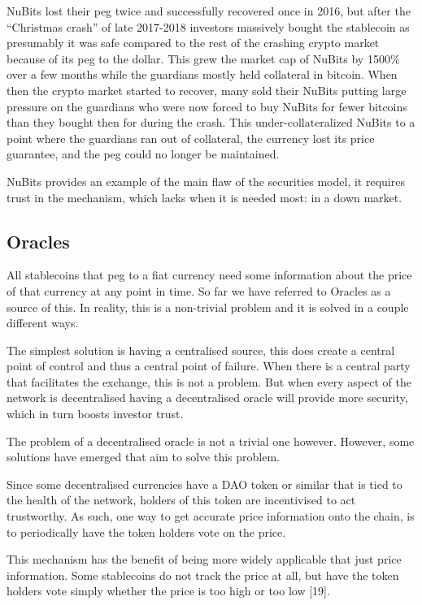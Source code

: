 \documentclass[english,]{IEEEtran}
\begin{document}
NuBits lost their peg twice and successfully recovered once in 2016, but
after the ``Christmas crash'' of late 2017-2018 investors massively
bought the stablecoin as presumably it was safe compared to the rest of
the crashing crypto market because of its peg to the dollar. This grew
the market cap of NuBits by 1500\% over a few months while the guardians
mostly held collateral in bitcoin. When then the crypto market started
to recover, many sold their NuBits putting large pressure on the
guardians who were now forced to buy NuBits for fewer bitcoins than they
bought then for during the crash. This under-collateralized NuBits to a
point where the guardians ran out of collateral, the currency lost its
price guarantee, and the peg could no longer be maintained.

NuBits provides an example of the main flaw of the securities model, it
requires trust in the mechanism, which lacks when it is needed most: in
a down market.

\subsection{Oracles}\label{oracles}

All stablecoins that peg to a fiat currency need some information about
the price of that currency at any point in time. So far we have referred
to Oracles as a source of this. In reality, this is a non-trivial
problem and it is solved in a couple different ways.

The simplest solution is having a centralised source, this does create a
central point of control and thus a central point of failure. When there
is a central party that facilitates the exchange, this is not a problem.
But when every aspect of the network is decentralised having a
decentralised oracle will provide more security, which in turn boosts
investor trust.

The problem of a decentralised oracle is not a trivial one however.
However, some solutions have emerged that aim to solve this problem.

Since some decentralised currencies have a DAO token or similar that is
tied to the health of the network, holders of this token are
incentivised to act trustworthy. As such, one way to get accurate price
information onto the chain, is to periodically have the token holders
vote on the price.

This mechanism has the benefit of being more widely applicable that just
price information. Some stablecoins do not track the price at all, but
have the token holders vote simply whether the price is too high or too
low {[}19{]}.
\end{document}
